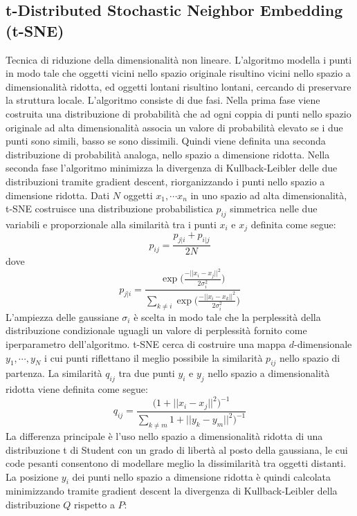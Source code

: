 \documentclass[11pt,a4paper,twocolumn]{article}
\begin{document}
\subsection{t-Distributed Stochastic Neighbor Embedding (t-SNE)}
Tecnica di riduzione della dimensionalità non lineare. L'algoritmo modella i punti in modo tale che oggetti vicini nello spazio originale risultino vicini nello spazio a dimensionalità ridotta, ed oggetti lontani risultino lontani, cercando di preservare la struttura locale. L'algoritmo consiste di due fasi. Nella prima fase viene costruita una distribuzione di probabilità che ad ogni coppia di punti nello spazio originale ad alta dimensionalità associa un valore di probabilità elevato se i due punti sono simili, basso se sono dissimili. Quindi viene definita una seconda distribuzione di probabilità analoga, nello spazio a dimensione ridotta. Nella seconda fase l'algoritmo  minimizza la divergenza di Kullback-Leibler delle due distribuzioni tramite gradient descent, riorganizzando i punti nello spazio a dimensione ridotta. Dati $ N $ oggetti $ x_1,\cdots x_n $ in uno spazio ad alta dimensionalità, t-SNE costruisce una distribuzione probabilistica $ p_{ij} $ simmetrica nelle due variabili e proporzionale alla similarità tra i punti $ x_i $ e $ x_j $ definita come segue:
\begin{equation}
\nonumber
p_{ij}=\frac{p_{j \lvert i}+ p_{i \lvert j}}{2N}
\end{equation}
dove
\begin{equation}
\nonumber
p_{j \lvert i}=\frac{\exp{\biggl(\frac{-\lvert \vert {x_i-x_j}\lvert \lvert^2}{2\sigma_i^2}\biggr)}}{\sum_{k \neq i}{\exp{\biggl(\frac{-\lvert \vert {x_i-x_k}\lvert \lvert^2}{2\sigma_i^2}\biggr)}}}
\end{equation}
L'ampiezza delle gaussiane $ \sigma_i $ è scelta in modo tale che la perplessità della distribuzione condizionale uguagli un valore di perplessità fornito come iperparametro dell'algoritmo. t-SNE cerca di costruire una mappa $ d $-dimensionale $y_1,\cdots, y_N $ i cui punti riflettano il meglio possibile la similarità $p_{ij}$ nello spazio di partenza. La similarità $ q_{ij} $ tra due punti $ y_i $ e $ y_j $ nello spazio a dimensionalità ridotta viene definita come segue:
\begin{equation}
\nonumber
q_{ij}=\frac{\bigl(1+\lvert \vert {x_i-x_j}\lvert \lvert^2\bigr)^{-1}}{\sum_{k \neq m}{1+\lvert \vert {y_k-y_m}\lvert \lvert^2\bigr)^{-1}}}
\end{equation}
La differenza principale è l'uso nello spazio a dimensionalità ridotta di una distribuzione t di Student con un grado di libertà al posto della gaussiana, le cui code pesanti consentono di modellare meglio la dissimilarità tra oggetti distanti. La posizione $ y_i $ dei punti nello spazio a dimensione ridotta è quindi calcolata minimizzando tramite gradient descent la divergenza di Kullback-Leibler della distribuzione $ Q $ rispetto a $ P $:
\end{document}
